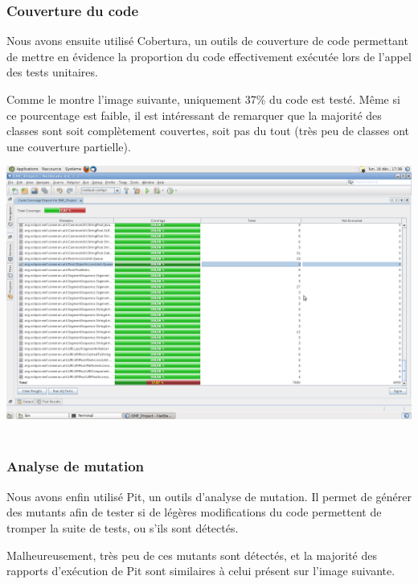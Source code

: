 \documentclass[a4paper]{article}
\begin{document}
		\subsubsection{Couverture du code}

		\vspace{0.5cm}

		Nous avons ensuite utilisé Cobertura, un outils de couverture de code permettant de mettre en évidence la proportion du code effectivement exécutée lors de l'appel des tests unitaires.

		Comme le montre l'image suivante, uniquement 37\% du code est testé. Même si ce pourcentage est faible, il est intéressant de remarquer que la majorité des classes sont soit complètement couvertes, soit pas du tout (très peu de classes ont une couverture partielle).

		\begin{center}
			\includegraphics[width=1.0\textwidth]{couverture.png}~\\
		\end{center}

		\subsubsection{Analyse de mutation}

		\vspace{0.5cm}

		Nous avons enfin utilisé Pit, un outils d'analyse de mutation. Il permet de générer des mutants afin de tester si de légères modifications du code permettent de tromper la suite de tests, ou s'ils sont détectés.

		Malheureusement, très peu de ces mutants sont détectés, et la majorité des rapports d'exécution de Pit sont similaires à celui présent sur l'image suivante.
\end{document}
